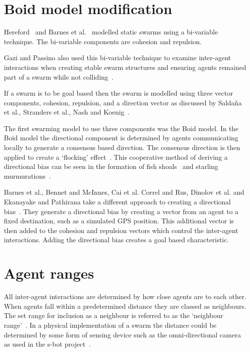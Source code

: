 \section{Boid model modification}\label{methods:BoidModel}
Hereford~\cite{HER:11} and Barnes et al.~\cite{BAF:06} modelled static swarms using a bi-variable technique. The bi-variable components are cohesion and repulsion. 

Gazi and Passino also used this bi-variable technique to examine inter-agent interactions when creating stable swarm structures and ensuring agents remained part of a swarm while not colliding~\cite{GP:04a, GP:02, GP:04}. 

If a swarm is to be goal based then the swarm is modelled using three vector components, cohesion, repulsion, and a direction vector as discussed by Salda\~na et al., Stranders et al., Nash and Koenig~\cite{SOM:12, SRDF:10, NK:10}. 

The first swarming model to use three components was the Boid model. In the Boid model the directional component is determined by agents communicating locally to generate a consensus based direction. The consensus direction is then applied to create a `flocking' effect~\cite{KC:08, REY:87}. This cooperative method of deriving a directional bias can be seen in the formation of fish shoals~\cite{YGT:10, PMRT:14} and starling murmurations~\cite{CS:15, ZZLW:14, PMRT:14}. 

Barnes et al., Bennet and McInnes, Cai et al. Correl and Rus, Dinolov et al. and Ekanayake and Pathirana take a different approach to creating a directional bias~\cite{BAF:06, BAFVM:06, BM:09, CML:ND, CR:13, DLK:11, EP:10}. They generate a directional bias by creating a vector from an agent to a fixed destination, such as a simulated GPS position. This additional vector is then added to the cohesion and repulsion vectors which control the inter-agent interactions. Adding the directional bias creates a goal based characteristic.  

\section{Agent ranges}
All inter-agent interactions are determined by how close agents are to each other. When agents fall within a predetermined distance they are classed as neighbours. The set range for inclusion as a neighbour is referred to as the `neighbour range'~\cite{BAF:06, BAFVM:06}. In a physical implementation of a swarm the distance could be determined by some form of sensing device such as the omni-directional camera as used in the s-bot project~\cite{HR:ND}. 


